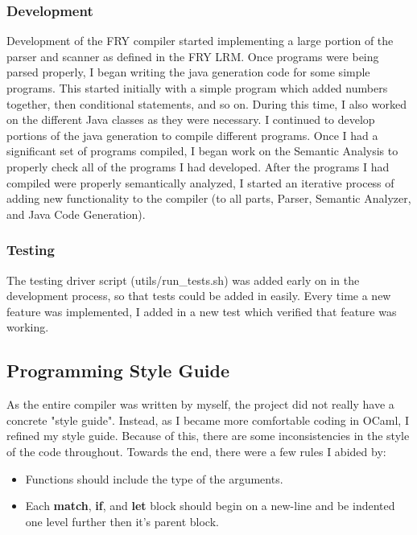 \documentclass{article}
\begin{document}
\subsubsection{Development}
Development of the FRY compiler started implementing a large portion of the parser and scanner as defined in the FRY LRM. Once programs were being parsed properly, I began writing the java generation code for some simple programs. This started initially with a simple program which added numbers together, then conditional statements, and so on. During this time, I also worked on the different Java classes as they were necessary. I continued to develop portions of the java generation to compile different programs. Once I had a significant set of programs compiled, I began work on the Semantic Analysis to properly check all of the programs I had developed. After the programs I had compiled were properly semantically analyzed, I started an iterative process of adding new functionality to the compiler (to all parts, Parser, Semantic Analyzer, and Java Code Generation).
\subsubsection{Testing}
The testing driver script (utils/run\_tests.sh) was added early on in the development process, so that tests could be added in easily. Every time a new feature was implemented, I added in a new test which verified that feature was working.

\subsection{Programming Style Guide}
As the entire compiler was written by myself, the project did not really have a concrete "style guide". Instead, as I became more comfortable coding in OCaml, I refined my style guide. Because of this, there are some inconsistencies in the style of the code throughout. Towards the end, there were a few rules I abided by:
\begin{itemize}
\item Functions should include the type of the arguments.
\item Each \textbf{match}, \textbf{if}, and \textbf{let} block should begin on a new-line and be indented one level further then it's parent block.
\end{itemize}
\end{document}
